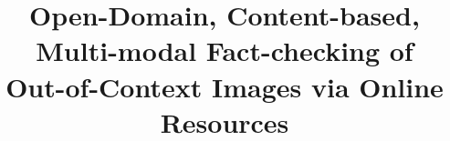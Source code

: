\documentclass[10pt,twocolumn,letterpaper]{article}
\begin{document}
\newcommand{\model}{\textit{CCN}}



\newcommand{\cmark}{\ding{51}}%
\newcommand{\xmark}{\ding{55}}%

\newcommand{\vcenteredinclude}[1]{\begingroup
\setbox0=\hbox{\texttt{[image: \#1]}}%
\parbox{\wd0}{\box0}\endgroup}

\newcommand{\mycircle}[2][black,fill=black]{\tikz[baseline=-0.5ex]\draw[#1,radius=#2] (0,0) circle ;}%

\def\boxit#1{%
  \smash{\color{harlequin}\fboxrule=1pt\relax\fboxsep=4pt\relax%
  \llap{\rlap{\fbox{\vphantom{0}\makebox[#1]{}}}~}}\ignorespaces
}

\title{Open-Domain, Content-based, Multi-modal Fact-checking of\\Out-of-Context Images via Online Resources}
\end{document}
